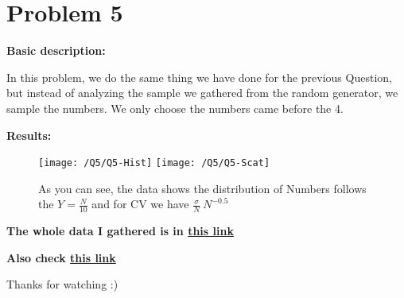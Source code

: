 \documentclass{article}
\begin{document}
    \pagebreak

    \section*{Problem 5}
    \textbf{Basic description:}

    In this problem, we do the same thing we have done for the previous Question,
    but instead of analyzing the sample we gathered from the random generator,
    we sample the numbers. We only choose the numbers came before the 4.

    \textbf{Results:}

    \begin{figure}[!htb]
        \centering
        \texttt{[image: /Q5/Q5-Hist]}
        \label{fig:5.1}
        \texttt{[image: /Q5/Q5-Scat]}
        \label{fig:5.2}
        \caption{As you can see, the data shows the distribution of Numbers follows the $Y = \frac{N}{10}$ and for CV we have $\frac{\sigma}{N}~N^{-0.5}$}
    \end{figure}

    \pagebreak

    \centering
    \textbf{The whole data I gathered is in \href{https://github.com/shahmari/ComputationalPhysics-Fall2021/tree/main/ProblemSet5/Data}{this link}}
    
    \textbf{Also check \href{https://www.youtube.com/watch?v=dQw4w9WgXcQ}{this link}}

    Thanks for watching :)
\end{document}

